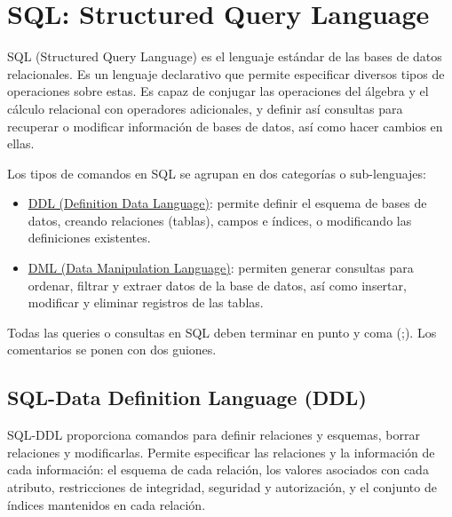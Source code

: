 \section{SQL: Structured Query Language}
SQL (Structured Query Language) es el lenguaje estándar de las bases de datos relacionales. Es un lenguaje declarativo que permite especificar diversos tipos de operaciones sobre estas. Es capaz de conjugar las operaciones del álgebra y el cálculo relacional con operadores adicionales, y definir así consultas para recuperar o modificar información de bases de datos, así como hacer cambios en ellas.

Los tipos de comandos en SQL se agrupan en dos categorías o sub-lenguajes:
\begin{itemize}
\item \underline{DDL (Definition Data Language)}: permite definir el esquema de bases de datos, creando relaciones (tablas), campos e índices, o modificando las definiciones existentes.
\item \underline{DML (Data Manipulation Language)}: permiten generar consultas para ordenar, filtrar y extraer datos de la base de datos, así como insertar, modificar y eliminar registros de las tablas.
\end{itemize}

Todas las queries o consultas en SQL deben terminar en punto y coma (;). Los comentarios se ponen con dos guiones.

\subsection{SQL-Data Definition Language (DDL)}
SQL-DDL proporciona comandos para definir relaciones y esquemas, borrar relaciones y modificarlas. Permite especificar las relaciones y la información de cada información: el esquema de cada relación, los valores asociados con cada atributo, restricciones de integridad, seguridad y autorización, y el conjunto de índices mantenidos en cada relación.

